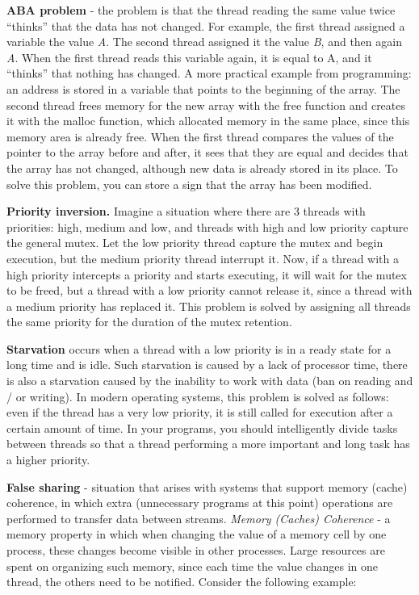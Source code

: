 {	\par\textbf{ABA problem} - the problem is that the thread reading the same value twice “thinks” that the data has not changed. For example, the first thread assigned a variable the value \textit{A}. The second thread assigned it the value \textit{B}, and then again \textit{A}. When the first thread reads this variable again, it is equal to A, and it “thinks” that nothing has changed. A more practical example from programming: an address is stored in a variable that points to the beginning of the array. The second thread frees memory for the new array with the free function and creates it with the malloc function, which allocated memory in the same place, since this memory area is already free. When the first thread compares the values of the pointer to the array before and after, it sees that they are equal and decides that the array has not changed, although new data is already stored in its place. To solve this problem, you can store a sign that the array has been modified.
	\par\textbf{Priority inversion.} Imagine a situation where there are 3 threads with priorities: high, medium and low, and threads with high and low priority capture the general mutex. Let the low priority thread capture the mutex and begin execution, but the medium priority thread interrupt it. Now, if a thread with a high priority intercepts a priority and starts executing, it will wait for the mutex to be freed, but a thread with a low priority cannot release it, since a thread with a medium priority has replaced it. This problem is solved by assigning all threads the same priority for the duration of the mutex retention.
	\par\textbf{Starvation} occurs when a thread with a low priority is in a ready state for a long time and is idle. Such starvation is caused by a lack of processor time, there is also a starvation caused by the inability to work with data (ban on reading and / or writing). In modern operating systems, this problem is solved as follows: even if the thread has a very low priority, it is still called for execution after a certain amount of time. In your programs, you should intelligently divide tasks between threads so that a thread performing a more important and long task has a higher priority.
	\par\textbf{False sharing} -  situation that arises with systems that support memory (cache) coherence, in which extra (unnecessary programs at this point) operations are performed to transfer data between streams. \textit{Memory (Caches) Coherence} - a memory property in which when changing the value of a memory cell by one process, these changes become visible in other processes. Large resources are spent on organizing such memory, since each time the value changes in one thread, the others need to be notified. Consider the following example:
}

